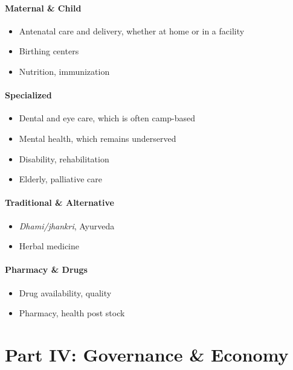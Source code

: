 \documentclass[11pt,a4paper]{article}
\begin{document}
\subsection{Maternal \& Child}
\begin{itemize}
    \item Antenatal care and delivery, whether at home or in a facility
    \item Birthing centers
    \item Nutrition, immunization
\end{itemize}

\subsection{Specialized}
\begin{itemize}
    \item Dental and eye care, which is often camp-based
    \item Mental health, which remains underserved
    \item Disability, rehabilitation
    \item Elderly, palliative care
\end{itemize}

\subsection{Traditional \& Alternative}
\begin{itemize}
    \item \textit{Dhami/jhankri}, Ayurveda
    \item Herbal medicine
\end{itemize}

\subsection{Pharmacy \& Drugs}
\begin{itemize}
    \item Drug availability, quality
    \item Pharmacy, health post stock
\end{itemize}

\part{Part IV: Governance \& Economy}
\end{document}
